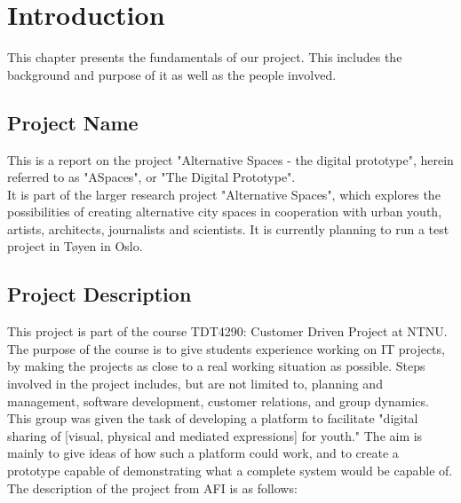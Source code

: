 \chapter{Introduction}
\label{chap:Intro}
This chapter presents the fundamentals of our project. This includes the background and purpose of it as well as the people involved.

\section{Project Name}
\label{sec:IntroProjName}
This is a report on the project "Alternative Spaces - the digital prototype", herein referred to as "ASpaces", or "The Digital Prototype". \\
It is part of the larger research project "Alternative Spaces", which explores the possibilities of creating alternative city spaces in cooperation with urban youth, artists, architects, journalists and scientists. It is currently planning to run a test project in Tøyen in Oslo.

\section{Project Description}
\label{sec:IntroProjectDescr}
This project is part of the course TDT4290: Customer Driven Project at NTNU. The purpose of the course is to give students experience working on IT projects, by making the projects as close to a real working situation as possible. Steps involved in the project includes, but are not limited to, planning and management, software development, customer relations, and group dynamics. \\
This group was given the task of developing a platform to facilitate "digital sharing of [visual, physical and mediated expressions] for youth." The aim is mainly to give ideas of how such a platform could work, and to create a prototype capable of demonstrating what a complete system would be capable of. \\
The description of the project from AFI is as follows:

